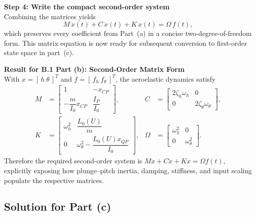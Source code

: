 \documentclass[12pt]{article}
\begin{document}
\begin{stepbox}
\textbf{Step 4: Write the compact second-order system}\\[0.5em]
Combining the matrices yields
\[
M\,\ddot{x}(t) + C\,\dot{x}(t) + K\,x(t) = \Omega\,f(t),
\]
which preserves every coefficient from Part~(a) in a concise two-degree-of-freedom form.  This matrix equation is now ready for subsequent conversion to first-order state space in part~(c).
\end{stepbox}

\begin{resultsbox}
\textbf{Result for B.1 Part (b): Second-Order Matrix Form}\\[0.5em]
With $x = [\,h \ \theta\,]^T$ and $f = [\,f_h \ f_\theta\,]^T$, the aeroelastic dynamics satisfy
\[
\begin{aligned}
M &= \begin{bmatrix}
1 & -x_{CP} \\
-\dfrac{m}{I_0}x_{CP} & \dfrac{I_P}{I_0}
\end{bmatrix}, &
C &= \begin{bmatrix}
2\zeta_h\omega_h & 0 \\
0 & 2\zeta_\theta\omega_\theta
\end{bmatrix},\\[0.7em]
K &= \begin{bmatrix}
\omega_h^2 & \dfrac{L_0(U)}{m} \\
0 & \omega_\theta^2 - \dfrac{L_0(U)x_{QP}}{I_0}
\end{bmatrix}, &
\Omega &= \begin{bmatrix}
\omega_h^2 & 0 \\
0 & \omega_\theta^2
\end{bmatrix}.
\end{aligned}
\]
Therefore the required second-order system is \(M\ddot{x} + C\dot{x} + Kx = \Omega f(t)\), explicitly exposing how plunge--pitch inertia, damping, stiffness, and input scaling populate the respective matrices.
\end{resultsbox}

\subsection*{Solution for Part (c)}
\end{document}
